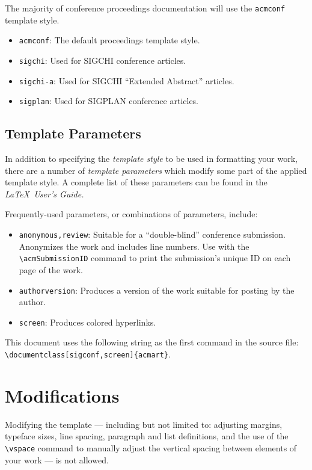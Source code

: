 \documentclass[sigconf]{acmart}
\begin{document}
The majority of conference proceedings documentation will use the {\verb|acmconf|} template style.
\begin{itemize}
\item {\verb|acmconf|}: The default proceedings template style.
\item{\verb|sigchi|}: Used for SIGCHI conference articles.
\item{\verb|sigchi-a|}: Used for SIGCHI ``Extended Abstract'' articles.
\item{\verb|sigplan|}: Used for SIGPLAN conference articles.
\end{itemize}

\subsection{Template Parameters}

In addition to specifying the {\it template style} to be used in formatting your work, there are a number of {\it template parameters} which modify some part of the applied template style. A complete list of these parameters can be found in the {\it \LaTeX\ User's Guide.}

Frequently-used parameters, or combinations of parameters, include:
\begin{itemize}
\item {\verb|anonymous,review|}: Suitable for a ``double-blind'' conference submission. Anonymizes the work and includes line numbers. Use with the \verb|\acmSubmissionID| command to print the submission's unique ID on each page of the work.
\item{\verb|authorversion|}: Produces a version of the work suitable for posting by the author.
\item{\verb|screen|}: Produces colored hyperlinks.
\end{itemize}

This document uses the following string as the first command in the source file: \verb|\documentclass[sigconf,screen]{acmart}|.

\section{Modifications}

Modifying the template --- including but not limited to: adjusting margins, typeface sizes, line spacing, paragraph and list definitions, and the use of the \verb|\vspace| command to manually adjust the vertical spacing between elements of your work --- is not allowed.
\end{document}

